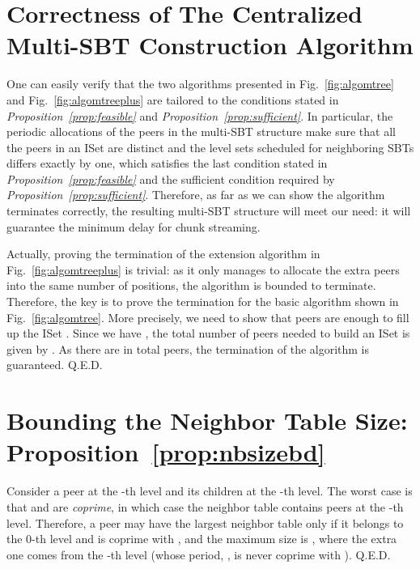 \documentclass[conference]{IEEEtran}
\begin{document}
\section{Correctness of The Centralized Multi-SBT Construction Algorithm} \label{sec:algomtree}
One can easily verify that the two algorithms presented in Fig.~\ref{fig:algomtree} and Fig.~\ref{fig:algomtreeplus} are tailored to the conditions stated in \textit{Proposition~\ref{prop:feasible}} and \textit{Proposition~\ref{prop:sufficient}}. In particular, the periodic allocations of the peers in the multi-SBT structure make sure that all the peers in an ISet are distinct and the level sets scheduled for neighboring SBTs differs exactly by one, which satisfies the last condition stated in  \textit{Proposition~\ref{prop:feasible}} and the sufficient condition required by \textit{Proposition~\ref{prop:sufficient}}. Therefore, as far as we can show the algorithm terminates correctly, the resulting multi-SBT structure will meet our need: it will guarantee the minimum delay for chunk streaming.

  Actually, proving the termination of the extension algorithm in Fig.~\ref{fig:algomtreeplus} is trivial: as it only manages to allocate the extra  peers into the same number of positions, the algorithm is bounded to terminate. Therefore, the key is to prove the termination for the basic algorithm shown in Fig.~\ref{fig:algomtree}. More precisely, we need to show that  peers are enough to fill up the ISet . Since we have , the total number of peers needed to build an ISet is given by . As there are in total  peers, the termination of the algorithm is guaranteed.  \hfill Q.E.D.

\section{Bounding the Neighbor Table Size: Proposition~\ref{prop:nbsizebd}} \label{sec:bndntb}
Consider a peer at the -th level and its children at the -th level. The worst case is that  and  are \textit{coprime}, in which case the neighbor table contains  peers at the -th level. Therefore, a peer may have the largest neighbor table only if it belongs to the 0-th level and  is coprime with , and the maximum size is , where the extra one comes from the -th level (whose period, , is never coprime with ). \hfill Q.E.D.
\end{document}
